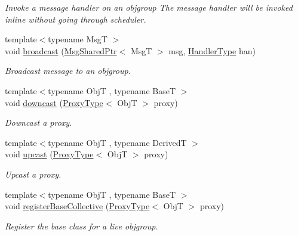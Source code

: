 \begin{DoxyCompactItemize}
\begin{DoxyCompactList}\small\item\em Invoke a message handler on an objgroup The message handler will be invoked inline without going through scheduler. \end{DoxyCompactList}\item 
{\footnotesize template$<$typename MsgT $>$ }\\void \hyperlink{structvt_1_1objgroup_1_1_obj_group_manager_a4bd17271d7a5d298ac74c73eedde4d8d}{broadcast} (\hyperlink{namespacevt_ab2b3d506ec8e8d1540aede826d84a239}{Msg\+Shared\+Ptr}$<$ MsgT $>$ msg, \hyperlink{namespacevt_af64846b57dfcaf104da3ef6967917573}{Handler\+Type} han)
\begin{DoxyCompactList}\small\item\em Broadcast message to an objgroup. \end{DoxyCompactList}\item 
{\footnotesize template$<$typename ObjT , typename BaseT $>$ }\\void \hyperlink{structvt_1_1objgroup_1_1_obj_group_manager_ab7ea99ad2668a99debd687a20bb9e3dd}{downcast} (\hyperlink{structvt_1_1objgroup_1_1_obj_group_manager_aea65eef52f240a52210132eef5ce591f}{Proxy\+Type}$<$ ObjT $>$ proxy)
\begin{DoxyCompactList}\small\item\em Downcast a proxy. \end{DoxyCompactList}\item 
{\footnotesize template$<$typename ObjT , typename DerivedT $>$ }\\void \hyperlink{structvt_1_1objgroup_1_1_obj_group_manager_abddd0f80c5b0f625a4ed487414c3b39b}{upcast} (\hyperlink{structvt_1_1objgroup_1_1_obj_group_manager_aea65eef52f240a52210132eef5ce591f}{Proxy\+Type}$<$ ObjT $>$ proxy)
\begin{DoxyCompactList}\small\item\em Upcast a proxy. \end{DoxyCompactList}\item 
{\footnotesize template$<$typename ObjT , typename BaseT $>$ }\\void \hyperlink{structvt_1_1objgroup_1_1_obj_group_manager_a6e869a6e38c7fe4e176814ca93ecf36e}{register\+Base\+Collective} (\hyperlink{structvt_1_1objgroup_1_1_obj_group_manager_aea65eef52f240a52210132eef5ce591f}{Proxy\+Type}$<$ ObjT $>$ proxy)
\begin{DoxyCompactList}\small\item\em Register the base class for a live objgroup. \end{DoxyCompactList}\item 

\end{DoxyCompactItemize}
